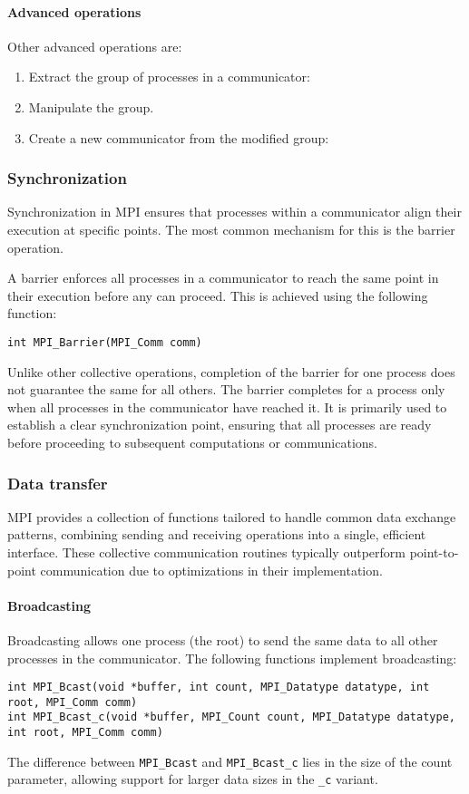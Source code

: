 \paragraph*{Advanced operations}
Other advanced operations are: 
\begin{enumerate}
    \item Extract the group of processes in a communicator: 
    \item Manipulate the group. 
    \item Create a new communicator from the modified group: 
\end{enumerate}

\subsubsection{Synchronization}
Synchronization in MPI ensures that processes within a communicator align their execution at specific points. 
The most common mechanism for this is the barrier operation.

A barrier enforces all processes in a communicator to reach the same point in their execution before any can proceed. 
This is achieved using the following function:
\begin{lstlisting}[style=C]
int MPI_Barrier(MPI_Comm comm)
\end{lstlisting}
Unlike other collective operations, completion of the barrier for one process does not guarantee the same for all others. 
The barrier completes for a process only when all processes in the communicator have reached it.
It is primarily used to establish a clear synchronization point, ensuring that all processes are ready before proceeding to subsequent computations or communications.

\subsubsection{Data transfer}
MPI provides a collection of functions tailored to handle common data exchange patterns, combining sending and receiving operations into a single, efficient interface. 
These collective communication routines typically outperform point-to-point communication due to optimizations in their implementation.

\paragraph*{Broadcasting}
Broadcasting allows one process (the root) to send the same data to all other processes in the communicator. The following functions implement broadcasting:
\begin{lstlisting}[style=C]
int MPI_Bcast(void *buffer, int count, MPI_Datatype datatype, int root, MPI_Comm comm)
int MPI_Bcast_c(void *buffer, MPI_Count count, MPI_Datatype datatype, int root, MPI_Comm comm)
\end{lstlisting}
The difference between \texttt{MPI\_Bcast} and \texttt{MPI\_Bcast\_c} lies in the size of the count parameter, allowing support for larger data sizes in the \texttt{\_c} variant.

